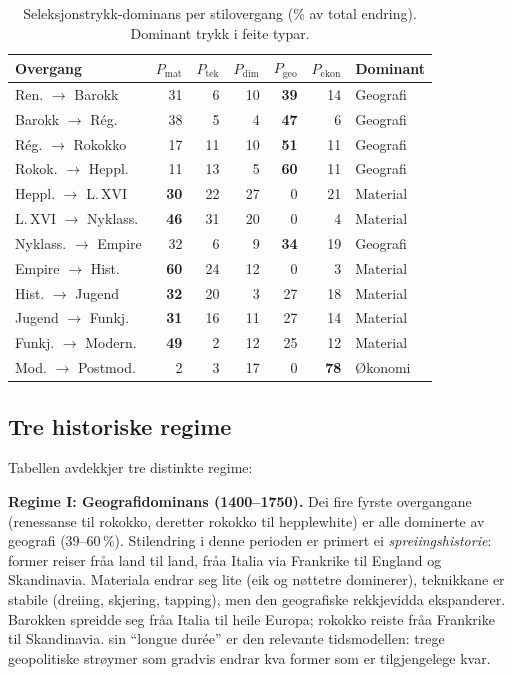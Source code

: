\documentclass[10pt, a4paper, twocolumn]{article}
\begin{document}
\begin{table}[!ht]
\centering
\caption{Seleksjonstrykk-dominans per stilovergang (\% av total endring). Dominant trykk i feite typar.}
\label{tab:trykk}
\begin{tabular}{lrrrrrl}
\toprule
\textbf{Overgang} & $P_{\text{mat}}$ & $P_{\text{tek}}$ & $P_{\text{dim}}$ & $P_{\text{geo}}$ & $P_{\text{ekon}}$ & \textbf{Dominant} \\
\midrule
Ren. $\rightarrow$ Barokk          & 31 & 6  & 10 & \textbf{39} & 14 & Geografi \\
Barokk $\rightarrow$ R\'{e}g.      & 38 & 5  & 4  & \textbf{47} & 6  & Geografi \\
R\'{e}g. $\rightarrow$ Rokokko     & 17 & 11 & 10 & \textbf{51} & 11 & Geografi \\
Rokok. $\rightarrow$ Heppl.        & 11 & 13 & 5  & \textbf{60} & 11 & Geografi \\
Heppl. $\rightarrow$ L.\,XVI       & \textbf{30} & 22 & 27 & 0  & 21 & Material \\
L.\,XVI $\rightarrow$ Nyklass.     & \textbf{46} & 31 & 20 & 0  & 4  & Material \\
Nyklass. $\rightarrow$ Empire      & 32 & 6  & 9  & \textbf{34} & 19 & Geografi \\
Empire $\rightarrow$ Hist.         & \textbf{60} & 24 & 12 & 0  & 3  & Material \\
Hist. $\rightarrow$ Jugend         & \textbf{32} & 20 & 3  & 27 & 18 & Material \\
Jugend $\rightarrow$ Funkj.        & \textbf{31} & 16 & 11 & 27 & 14 & Material \\
Funkj. $\rightarrow$ Modern.       & \textbf{49} & 2  & 12 & 25 & 12 & Material \\
Mod. $\rightarrow$ Postmod.        & 2  & 3  & 17 & 0  & \textbf{78} & \O konomi \\
\bottomrule
\end{tabular}
\end{table}


\subsection{Tre historiske regime}

Tabellen avdekkjer tre distinkte regime:

\textbf{Regime I: Geografidominans (1400--1750).} Dei fire fyrste overgangane (renessanse til rokokko, deretter rokokko til hepplewhite) er alle dominerte av geografi (39--60\,\%). Stilendring i denne perioden er primert ei \emph{spreiingshistorie}: former reiser fr\r{a}a land til land, fr\r{a}a Italia via Frankrike til England og Skandinavia. Materiala endrar seg lite (eik og n\o ttetre dominerer), teknikkane er stabile (dreiing, skjering, tapping), men den geografiske rekkjevidda ekspanderer. Barokken spreidde seg fr\r{a}a Italia til heile Europa; rokokko reiste fr\r{a}a Frankrike til Skandinavia. \citet{braudel1979} sin ``longue dur\'{e}e'' er den relevante tidsmodellen: trege geopolitiske str\o ymer som gradvis endrar kva former som er tilgjengelege kvar.
\end{document}
